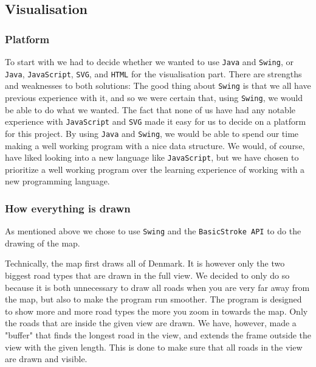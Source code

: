 \documentclass[a4paper,11pt]{article}
\begin{document}
\subsection{Visualisation} %
\label{sub:Visualisation}


\subsubsection{Platform} %
\label{subsub:Platform}
To start with we had to decide whether we wanted to use \texttt{Java} and \texttt{Swing}, or \texttt{Java}, \texttt{JavaScript}, \texttt{SVG}, and \texttt{HTML} for the visualisation part. There are strengths and weaknesses to both solutions: The good thing about \texttt{Swing} is that we all have previous experience with it, and so we were certain that, using \texttt{Swing}, we would be able to do what we wanted. 
The fact that none of us have had any notable experience with \texttt{JavaScript} and \texttt{SVG} made it easy for us to decide on a platform for this project. By using \texttt{Java} and \texttt{Swing}, we would be able to spend our time making a well working program with a nice data structure. We would, of course, have liked looking into a new language like \texttt{JavaScript}, but we have chosen to prioritize a well working program over the learning experience of working with a new programming language.

\subsubsection{How everything is drawn} %
\label{subsub:How everything is drawn}
As mentioned above we chose to use \texttt{Swing} and the \texttt{BasicStroke API} to do the drawing of the map. 

Technically, the map first draws all of Denmark. It is however only the two biggest road types that are drawn in the full view. We decided to only do so because it is both unnecessary to draw all roads when you are very far away from the map, but also to make the program run smoother. The program is designed to show more and more road types the more you zoom in towards the map. Only the roads that are inside the given view are drawn. We have, however, made a "buffer" that finds the longest road in the view, and extends the frame outside the view with the given length. This is done to make sure that all roads in the view are drawn and visible.
\end{document}
